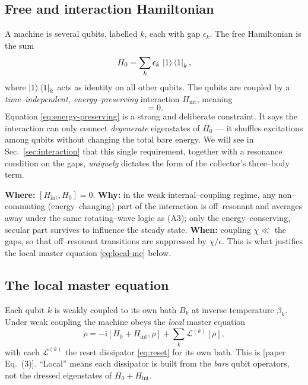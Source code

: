 \documentclass[11pt,a4paper]{article}
\newcommand{\ii}{\mathrm{i}}
\newcommand{\calL}{\mathcal{L}}
\theoremstyle{definition}
\theoremstyle{remark}
\begin{document}
\subsection{Free and interaction Hamiltonian}
A machine is several qubits, labelled $k$, each with gap $\epsilon_k$.
The free Hamiltonian is the sum
\begin{equation}
H_0 = \sum_k \epsilon_k\,\ket{1}\bra{1}_k ,
\label{eq:H0-machine}
\end{equation}
where $\ket{1}\bra{1}_k$ acts as identity on all other qubits. The
qubits are coupled by a \emph{time--independent, energy--preserving}
interaction $H_{\mathrm{int}}$, meaning
\begin{equation}
[H_{\mathrm{int}}, H_0] = 0 .
\label{eq:energy-preserving}
\end{equation}
Equation \eqref{eq:energy-preserving} is a strong and deliberate
constraint. It says the interaction can only connect
\emph{degenerate} eigenstates of $H_0$ --- it shuffles excitations among
qubits without changing the total bare energy. We will see in
Sec.~\ref{sec:interaction} that this single requirement, together with a
resonance condition on the gaps, \emph{uniquely} dictates the form of
the collector's three--body term.

\begin{approxbox}
\textbf{Where:} $[H_{\mathrm{int}},H_0]=0$. \textbf{Why:} in the weak
internal--coupling regime, any non--commuting (energy--changing) part of
the interaction is off--resonant and averages away under the same
rotating--wave logic as (A3); only the energy--conserving, secular part
survives to influence the steady state. \textbf{When:} coupling
$\chi\ll$ the gaps, so that off--resonant transitions are suppressed by
$\chi/\epsilon$. This is what justifies the local master equation
\eqref{eq:local-me} below.
\end{approxbox}

\subsection{The local master equation}
Each qubit $k$ is weakly coupled to its own bath $B_k$ at inverse
temperature $\beta_k$. Under weak coupling the machine obeys the
\emph{local} master equation
\begin{equation}
\dot\rho = -\ii[H_0 + H_{\mathrm{int}},\rho]
+ \sum_k \calL^{(k)}[\rho],
\label{eq:local-me}
\end{equation}
with each $\calL^{(k)}$ the reset dissipator \eqref{eq:reset} for its own
bath. This is [paper Eq.~(3)]. ``Local'' means each dissipator is built
from the \emph{bare} qubit operators, not the dressed eigenstates of
$H_0+H_{\mathrm{int}}$.
\end{document}
